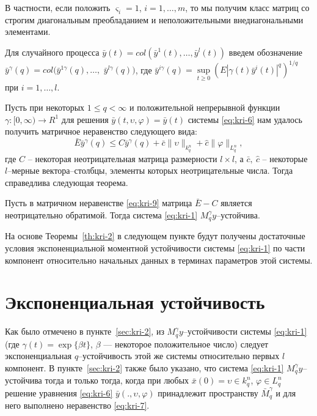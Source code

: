 В частности, если положить $\varsigma _i = 1$, $i = 1,\dots,m$, то мы
получим класс матриц со строгим диагональным преобладанием и
неположительными внедиагональными элементами.

Для случайного процесса $\bar y(t) = col(\bar y^1(t),\dots, \bar
y^l(t))$ введем обозначение $ \bar y^\gamma (q) = col (\bar
y^{1\gamma }(q),\dots,$ $\bar y^{l\gamma }(q))$, где $\bar y^{i\gamma
}(q) = \sup \limits _{t \geq 0}\left (E|\gamma (t) \bar
y^i(t)|^{q}\right )^{1/q}$ при $i = 1,\dots,l$.

Пусть при некоторых $1\le q < \infty $ и положительной непрерывной
функции $\gamma :[0, \infty) \rightarrow R^1 $ для решения $\bar
y(t,\upsilon,\varphi) =  \bar y(t)$ системы \eqref{eq:kri-6} нам удалось
получить матричное неравенство следующего вида:
\begin{equation}
    \label{eq:kri-9}
    \bar E\bar y^\gamma (q) \leq C\bar y^\gamma (q) + \bar
    c\|\upsilon\|_{k^n_{q}} + \hat c \|\varphi \|_{L^n_q} ,
\end{equation}
где $C$ -- некоторая неотрицательная матрица размерности $l\times
l$, а $\bar c, \ \hat c$ -- некоторые $l$--мерные вектора--столбцы,
элементы которых неотрицательные числа. Тогда справедлива следующая
теорема.

\begin{theorem}\label{th:kri-2}
    Пусть в матричном неравенстве \eqref{eq:kri-9} матрица
    $\bar E - C$ является неотрицательно обратимой. Тогда система \eqref{eq:kri-1}
    $M_q^\gamma y$--устойчива.
\end{theorem}


На основе Теоремы~\ref{th:kri-2} в следующем пункте будут получены достаточные
условия экспоненциальной моментной устойчивости системы \eqref{eq:kri-1} по части
компонент относительно начальных данных в терминах параметров этой
системы.

\section{Экспоненциальная устойчивость}\label{sec:kri-3}

Как было отмечено в
пункте~\ref{sec:kri-2}, из $M_q^\gamma y$--устойчивости системы \eqref{eq:kri-1} (где $\gamma
(t) = \exp \{\beta t\}$, $\beta$ --- некоторое положительное число)
следует экспоненциальная $q$--устойчивость этой же системы
относительно первых $l$ компонент. В пункте~\ref{sec:kri-2} также было указано,
что система \eqref{eq:kri-1} $M_q^\gamma y$--устойчива тогда и только тогда,
когда при любых $\bar x(0) = \upsilon \in k^n_q$, $\varphi \in
L^n_q$ решение уравнения \eqref{eq:kri-6} $\bar y(., \upsilon, \varphi)$
принадлежит пространству $\bar M_q^\gamma $ и для него выполнено
неравенство \eqref{eq:kri-7}.

